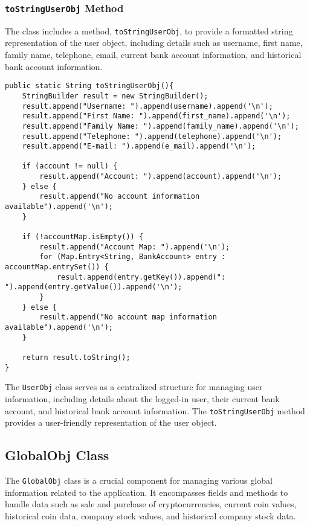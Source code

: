 \documentclass{article}
\begin{document}
\subsubsection{\texttt{toStringUserObj} Method}

The class includes a method, \texttt{toStringUserObj}, to provide a formatted string representation of the user object, including details such as username, first name, family name, telephone, email, current bank account information, and historical bank account information.

\begin{verbatim}
public static String toStringUserObj(){
    StringBuilder result = new StringBuilder();
    result.append("Username: ").append(username).append('\n');
    result.append("First Name: ").append(first_name).append('\n');
    result.append("Family Name: ").append(family_name).append('\n');
    result.append("Telephone: ").append(telephone).append('\n');
    result.append("E-mail: ").append(e_mail).append('\n');

    if (account != null) {
        result.append("Account: ").append(account).append('\n');
    } else {
        result.append("No account information available").append('\n');
    }

    if (!accountMap.isEmpty()) {
        result.append("Account Map: ").append('\n');
        for (Map.Entry<String, BankAccount> entry : accountMap.entrySet()) {
            result.append(entry.getKey()).append(": ").append(entry.getValue()).append('\n');
        }
    } else {
        result.append("No account map information available").append('\n');
    }

    return result.toString();
}
\end{verbatim}

The \texttt{UserObj} class serves as a centralized structure for managing user information, including details about the logged-in user, their current bank account, and historical bank account information. The \texttt{toStringUserObj} method provides a user-friendly representation of the user object.

\subsection{GlobalObj Class}\label{global-obj}

The \texttt{GlobalObj} class is a crucial component for managing various global information related to the application. It encompasses fields and methods to handle data such as sale and purchase of cryptocurrencies, current coin values, historical coin data, company stock values, and historical company stock data.
\end{document}
